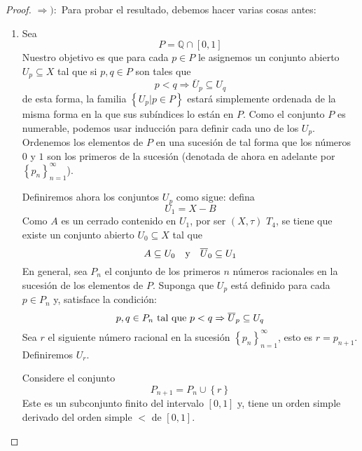 \documentclass[12pt]{report}
\theoremstyle{largebreak}
\newcommand{\Cls}[1]{\ensuremath{\overline{#1}}}
\begin{document}
    \begin{proof}
        $\Rightarrow):$ Para probar el resultado, debemos hacer varias cosas antes:
        \begin{enumerate}
            \item Sea
            \begin{equation*}
                P=\mathbb{Q}\cap[0,1]
            \end{equation*}
            Nuestro objetivo es que para cada $p\in P$ le asignemos un conjunto abierto $U_p\subseteq X$ tal que si $p,q\in P$ son tales que
            \begin{equation*}
                p<q\Rightarrow \Cls{U}_p \subseteq U_q
            \end{equation*}
            de esta forma, la familia $\left\{U_p\Big|p\in P \right\}$ estará simplemente ordenada de la misma forma en la que sus subíndices lo están en $P$. Como el conjunto $P$ es numerable, podemos usar inducción para definir cada uno de los $U_p$. Ordenemos los elementos de $P$ en una sucesión de tal forma que los números $0$ y $1$ son los primeros de la sucesión (denotada de ahora en adelante por $\left\{p_n \right\}_{n=1}^\infty$).

            Definiremos ahora los conjuntos $U_p$ como sigue: defina
            \begin{equation*}
                U_1=X-B
            \end{equation*}
            Como $A$ es un cerrado contenido en $U_1$, por ser $(X,\tau)$ $T_4$, se tiene que existe un conjunto abierto $U_0\subseteq X$ tal que
            \begin{equation*}
                A\subseteq U_0\quad\textup{y}\quad\Cls{U}_0\subseteq U_1
            \end{equation*}
            En general, sea $P_n$ el conjunto de los primeros $n$ números racionales en la sucesión de los elementos de $P$. Suponga que $U_p$ está definido para cada $p\in P_n$ y, satisface la condición:
            \begin{equation*}
                p,q\in P_n\textup{ tal que }p<q\Rightarrow \Cls{U}_p\subseteq U_q
            \end{equation*}
            Sea $r$ el siguiente número racional en la sucesión $\left\{p_n \right\}_{n=1}^\infty$, esto es $r=p_{ n+1}$. Definiremos $U_r$.

            Considere el conjunto
            \begin{equation*}
                P_{ n+1}=P_n\cup\left\{r \right\}
            \end{equation*}
            Este es un subconjunto finito del intervalo $[0,1]$ y, tiene un orden simple derivado del orden simple $<$ de $[0,1]$.


\end{enumerate}
\end{proof}
\end{document}

